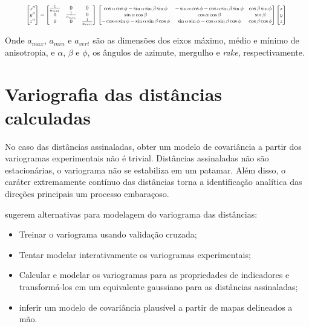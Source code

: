 \begin{equation}
\resizebox{.9 \textwidth}{!}{%
$
\begin{bmatrix} x'' \\ y'' \\ z'' \end{bmatrix} = \begin{bmatrix} \frac{1}{a_{max}} & 0 & 0 \\ 0 & \frac{1}{a_{min}} & 0 \\ 0 & 0 & \frac{1}{a_{vert}} \end{bmatrix} \\ \begin{bmatrix}\cos\alpha\cos\phi-\sin\alpha\sin\beta\sin\phi & -\sin\alpha\cos\phi-\cos\alpha\sin\beta\sin\phi & \cos\beta\sin\phi \\ \sin\alpha\cos\beta & \cos\alpha\cos\beta & \sin\beta \\ -\cos\alpha\sin\phi-\sin\alpha\sin\beta\cos\phi & \sin\alpha\sin\phi-\cos\alpha\sin\beta\cos\phi & \cos\beta\cos\phi \end{bmatrix} \begin{bmatrix} x \\ y \\ z \end{bmatrix}
$
}
\label{eq_rot_matrix}
\end{equation}

Onde $a_{max}$, $a_{min}$ e $a_{vert}$ são as dimensões dos eixos máximo, médio e mínimo de anisotropia, e $\alpha$, $\beta$ e $\phi$, os ângulos de azimute, mergulho e \textit{rake}, respectivamente.

\section{Variografia das distâncias calculadas}

No caso das distâncias assinaladas, obter um modelo de covariância a partir dos variogramas experimentais não é trivial. Distâncias assinaladas não são estacionárias, o variograma não se estabiliza em um patamar. Além disso, o caráter extremamente contínuo das distâncias torna a identificação analítica das direções principais um processo embaraçoso.

 sugerem alternativas para modelagem do variograma das distâncias:

\begin{itemize}
    \item Treinar o variograma usando validação cruzada;
    \item Tentar modelar interativamente os variogramas experimentais;
    \item Calcular e modelar os variogramas para as propriedades de indicadores e transformá-los em um equivalente gaussiano para as distâncias assinaladas;
    \item inferir um modelo de covariância plausível a partir de mapas delineados a mão.
\end{itemize}

